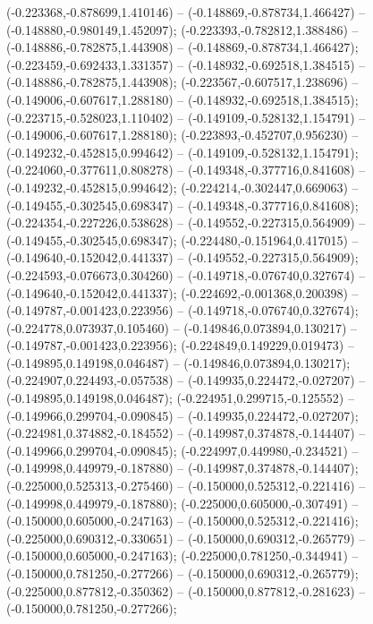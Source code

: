  (-0.223368,-0.878699,1.410146) -- (-0.148869,-0.878734,1.466427) -- (-0.148880,-0.980149,1.452097);
 (-0.223393,-0.782812,1.388486) -- (-0.148886,-0.782875,1.443908) -- (-0.148869,-0.878734,1.466427);
 (-0.223459,-0.692433,1.331357) -- (-0.148932,-0.692518,1.384515) -- (-0.148886,-0.782875,1.443908);
 (-0.223567,-0.607517,1.238696) -- (-0.149006,-0.607617,1.288180) -- (-0.148932,-0.692518,1.384515);
 (-0.223715,-0.528023,1.110402) -- (-0.149109,-0.528132,1.154791) -- (-0.149006,-0.607617,1.288180);
 (-0.223893,-0.452707,0.956230) -- (-0.149232,-0.452815,0.994642) -- (-0.149109,-0.528132,1.154791);
 (-0.224060,-0.377611,0.808278) -- (-0.149348,-0.377716,0.841608) -- (-0.149232,-0.452815,0.994642);
 (-0.224214,-0.302447,0.669063) -- (-0.149455,-0.302545,0.698347) -- (-0.149348,-0.377716,0.841608);
 (-0.224354,-0.227226,0.538628) -- (-0.149552,-0.227315,0.564909) -- (-0.149455,-0.302545,0.698347);
 (-0.224480,-0.151964,0.417015) -- (-0.149640,-0.152042,0.441337) -- (-0.149552,-0.227315,0.564909);
 (-0.224593,-0.076673,0.304260) -- (-0.149718,-0.076740,0.327674) -- (-0.149640,-0.152042,0.441337);
 (-0.224692,-0.001368,0.200398) -- (-0.149787,-0.001423,0.223956) -- (-0.149718,-0.076740,0.327674);
 (-0.224778,0.073937,0.105460) -- (-0.149846,0.073894,0.130217) -- (-0.149787,-0.001423,0.223956);
 (-0.224849,0.149229,0.019473) -- (-0.149895,0.149198,0.046487) -- (-0.149846,0.073894,0.130217);
 (-0.224907,0.224493,-0.057538) -- (-0.149935,0.224472,-0.027207) -- (-0.149895,0.149198,0.046487);
 (-0.224951,0.299715,-0.125552) -- (-0.149966,0.299704,-0.090845) -- (-0.149935,0.224472,-0.027207);
 (-0.224981,0.374882,-0.184552) -- (-0.149987,0.374878,-0.144407) -- (-0.149966,0.299704,-0.090845);
 (-0.224997,0.449980,-0.234521) -- (-0.149998,0.449979,-0.187880) -- (-0.149987,0.374878,-0.144407);
 (-0.225000,0.525313,-0.275460) -- (-0.150000,0.525312,-0.221416) -- (-0.149998,0.449979,-0.187880);
 (-0.225000,0.605000,-0.307491) -- (-0.150000,0.605000,-0.247163) -- (-0.150000,0.525312,-0.221416);
 (-0.225000,0.690312,-0.330651) -- (-0.150000,0.690312,-0.265779) -- (-0.150000,0.605000,-0.247163);
 (-0.225000,0.781250,-0.344941) -- (-0.150000,0.781250,-0.277266) -- (-0.150000,0.690312,-0.265779);
 (-0.225000,0.877812,-0.350362) -- (-0.150000,0.877812,-0.281623) -- (-0.150000,0.781250,-0.277266);
